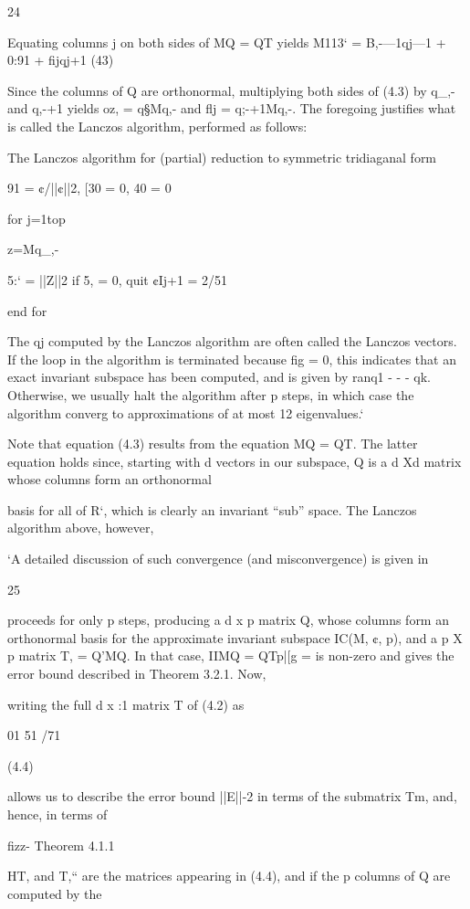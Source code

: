 24

Equating columns j on both sides of MQ = QT yields
M113‘ = B,-—1qj—1 + 0:91 + ﬁjqj+1 (43)

Since the columns of Q are orthonormal, multiplying both sides of (4.3) by q_,- and q,-+1 yields
oz, = q§Mq,- and ﬂj = q;-+1Mq,-.
The foregoing justifies what is called the Lanczos algorithm, performed as follows:

The Lanczos algorithm for (partial) reduction to symmetric tridiaganal form

91 = ¢/||¢||2, [30 = 0, 40 = 0

for j=1top

z=Mq_,-

5:‘ = ||Z||2
if 5, = 0, quit
¢Ij+1 = 2/51

end for

The qj computed by the Lanczos algorithm are often called the Lanczos vectors. If the
loop in the algorithm is terminated because ﬁg = 0, this indicates that an exact invariant subspace
has been computed, and is given by ran{q1 - - - qk}. Otherwise, we usually halt the algorithm after
p steps, in which case the algorithm converg to approximations of at most 12 eigenvalues.‘

Note that equation (4.3) results from the equation MQ = QT. The latter equation holds
since, starting with d vectors in our subspace, Q is a d Xd matrix whose columns form an orthonormal

basis for all of R‘, which is clearly an invariant “sub” space. The Lanczos algorithm above, however,

‘A detailed discussion of such convergence (and misconvergence) is given in 

25

proceeds for only p steps, producing a d x p matrix Q, whose columns form an orthonormal basis
for the approximate invariant subspace IC(M, ¢, p), and a p X p matrix T, = Q'MQ. In that case,
IIMQ = QTp|[g =  is non-zero and gives the error bound described in Theorem 3.2.1. Now,

writing the full d x :1 matrix T of (4.2) as

01 51
/71

(4.4)

   

allows us to describe the error bound ||E||-2 in terms of the submatrix Tm, and, hence, in terms of

ﬁzz-
Theorem 4.1.1

HT, and T,“ are the matrices appearing in (4.4), and if the p columns of Q are computed by the

